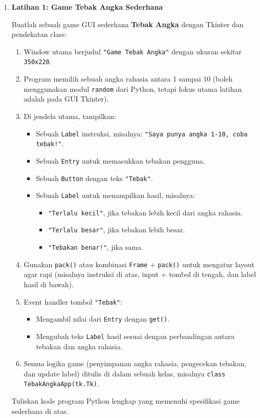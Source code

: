 \begin{enumerate}
  

  \item \textbf{Latihan 1: Game Tebak Angka Sederhana}

  Buatlah sebuah game GUI sederhana \textbf{Tebak Angka} dengan Tkinter dan pendekatan class:
  \begin{enumerate}
    \item Window utama berjudul \texttt{"Game Tebak Angka"} dengan ukuran sekitar \texttt{350x220}.
    \item Program memilih sebuah angka rahasia antara 1 sampai 10 (boleh menggunakan modul \texttt{random} dari Python, tetapi fokus utama latihan adalah pada GUI Tkinter).
    \item Di jendela utama, tampilkan:
          \begin{itemize}
            \item Sebuah \texttt{Label} instruksi, misalnya: \texttt{"Saya punya angka 1-10, coba tebak!"}.
            \item Sebuah \texttt{Entry} untuk memasukkan tebakan pengguna.
            \item Sebuah \texttt{Button} dengan teks \texttt{"Tebak"}.
            \item Sebuah \texttt{Label} untuk menampilkan hasil, misalnya:
                  \begin{itemize}
                    \item \texttt{"Terlalu kecil"}, jika tebakan lebih kecil dari angka rahasia.
                    \item \texttt{"Terlalu besar"}, jika tebakan lebih besar.
                    \item \texttt{"Tebakan benar!"}, jika sama.
                  \end{itemize}
          \end{itemize}
    \item Gunakan \texttt{pack()} atau kombinasi \texttt{Frame} + \texttt{pack()} untuk mengatur layout agar rapi (misalnya instruksi di atas, input + tombol di tengah, dan label hasil di bawah).
    \item Event handler tombol \texttt{"Tebak"}:
          \begin{itemize}
            \item Mengambil nilai dari \texttt{Entry} dengan \texttt{get()}.
            \item Mengubah teks \texttt{Label} hasil sesuai dengan perbandingan antara tebakan dan angka rahasia.
          \end{itemize}
    \item Semua logika game (penyimpanan angka rahasia, pengecekan tebakan, dan update label) ditulis di dalam sebuah kelas, misalnya \texttt{class TebakAngkaApp(tk.Tk)}.
  \end{enumerate}
  Tuliskan kode program Python lengkap yang memenuhi spesifikasi game sederhana di atas.



\end{enumerate}

